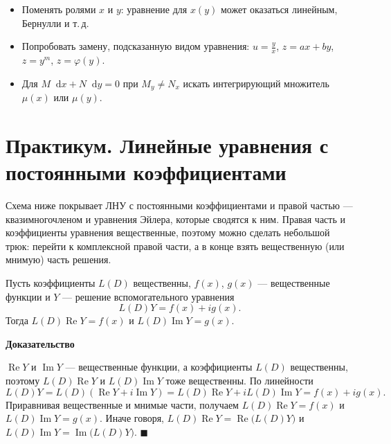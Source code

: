 \documentclass[12pt,a4paper]{article}
\numberwithin{equation}{section}
\renewcommand{\Re}{\operatorname{Re}}
\renewcommand{\Im}{\operatorname{Im}}
\newcommand{\dd}{\mathop{}\!\mathrm{d}}
\renewenvironment{proof}[1][Доказательство]{\begin{center}\textbf{#1}\end{center}}{\hfill$\blacksquare$\par}
\begin{document}
\begin{remarkHSE}
\begin{itemize}
  \item Поменять ролями $x$ и $y$: уравнение для $x(y)$ может оказаться линейным, Бернулли и т.\,д.
  \item Попробовать замену, подсказанную видом уравнения: $u=\frac yx$, $z=ax+by$, $z=y^m$, $z=\varphi(y)$.
  \item Для $M\dd x+N\dd y=0$ при $M_y\neq N_x$ искать интегрирующий множитель $\mu(x)$ или $\mu(y)$.
\end{itemize}
\end{remarkHSE}

\section[Практикум по линейным уравнениям]{Практикум. Линейные уравнения с постоянными коэффициентами}
\label{sec:lu-const-scheme}
Схема ниже покрывает ЛНУ с постоянными коэффициентами и правой частью --- квазимногочленом и уравнения Эйлера, которые сводятся к ним. Правая часть и коэффициенты уравнения вещественные, поэтому можно сделать небольшой трюк: перейти к комплексной правой части, а в конце взять вещественную (или мнимую) часть решения.

\begin{lemmaHSE}
Пусть коэффициенты \(L(D)\) вещественны, \(f(x)\), \(g(x)\) --- вещественные функции и \(Y\) --- решение вспомогательного уравнения
\[
L(D)Y=f(x)+ig(x).
\]
Тогда \(L(D)\Re Y=f(x)\) и \(L(D)\Im Y=g(x)\).
\end{lemmaHSE}

\begin{proof}
\(\Re Y\) и \(\Im Y\) --- вещественные функции, а коэффициенты \(L(D)\) вещественны, поэтому \(L(D)\Re Y\) и \(L(D)\Im Y\) тоже вещественны. По линейности
\[
L(D)Y=L(D)(\Re Y+i\Im Y)=L(D)\Re Y+iL(D)\Im Y=f(x)+ig(x).
\]
Приравнивая вещественные и мнимые части, получаем \(L(D)\Re Y=f(x)\) и \(L(D)\Im Y=g(x)\). Иначе говоря, \(\boxed{L(D)\Re Y=\Re\bigl(L(D)Y\bigr)}\) и \(L(D)\Im Y=\Im\bigl(L(D)Y\bigr)\).
\end{proof}
\end{document}
